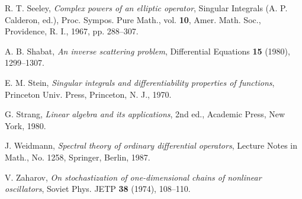 \documentclass{surv-l}
\theoremstyle{plain}
\theoremstyle{definition}
\numberwithin{equation}{chapter}
\begin{document}
\begin{thebibliography}{AKNS}
 R. T. Seeley, \emph{Complex powers of an elliptic operator}, Singular Integrals (A. P. Calderon, ed.), Proc. Sympos. Pure Math., vol. \textbf{10}, Amer. Math. Soc., Providence, R. I., 1967, pp. 288--307.

 A. B. Shabat, \emph{An inverse scattering problem}, Differential Equations \textbf{15} (1980), 1299--1307.

 E. M. Stein, \emph{Singular integrals and differentiability properties of functions}, Princeton Univ. Press, Princeton, N. J., 1970.

 G. Strang, \emph{Linear algebra and its applications}, 2nd ed., Academic Press, New York, 1980.

 J. Weidmann, \emph{Spectral theory of ordinary differential operators}, Lecture Notes in Math., No. 1258, Springer, Berlin, 1987.

 V. Zaharov, \emph{On stochastization of one-dimensional chains of nonlinear oscillators}, Soviet Phys. JETP \textbf{38} (1974), 108--110.
\end{thebibliography}
\end{document}
